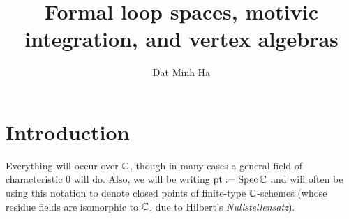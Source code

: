 

\setcounter{section}{-1}





    \title{Formal loop spaces, motivic integration, and vertex algebras}
    
    \author{Dat Minh Ha}
    \maketitle
    
    \begin{abstract}
        
    \end{abstract}
    
    {
      \hypersetup{} 
      \tableofcontents %
    }

    \section{Introduction}
        \begin{convention}
            Everything will occur over $\mathbb{C}$, though in many cases a general field of characteristic $0$ will do. Also, we will be writing $\mathrm{pt} := \operatorname{Spec} \mathbb{C}$ and will often be using this notation to denote closed points of finite-type $\mathbb{C}$-schemes (whose residue fields are isomorphic to $\mathbb{C}$, due to Hilbert's \textit{Nullstellensatz}).
        \end{convention}

    

    
	
    \printbibliography

